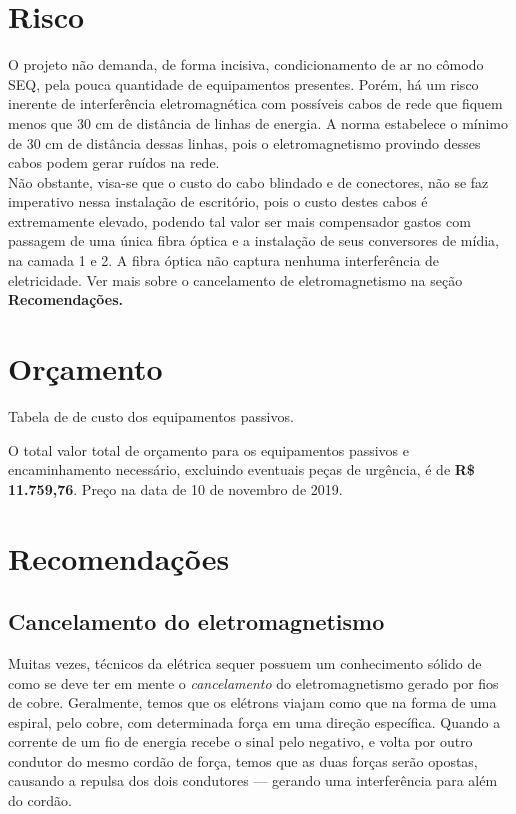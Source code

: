 \documentclass[	DIV=calc,%
							paper=a4,%
							fontsize=12pt,%
							onecolumn]{scrartcl}	 					%
\begin{document}
\section{Risco}

O projeto não demanda, de forma incisiva, condicionamento de ar no cômodo SEQ, pela pouca quantidade de equipamentos presentes. Porém, há um risco inerente de interferência eletromagnética com possíveis cabos de rede que fiquem menos que 30 cm de distância de linhas de energia. A norma estabelece o mínimo de 30 cm de distância dessas linhas, pois o eletromagnetismo provindo desses cabos podem gerar ruídos na rede.
\\

Não obstante, visa-se que o custo do cabo blindado e de conectores, não se faz imperativo nessa instalação de escritório, pois o custo destes cabos é extremamente elevado, podendo tal valor ser mais compensador gastos com passagem de uma única fibra óptica e a instalação de seus conversores de mídia, na camada 1 e 2. A fibra óptica não captura nenhuma interferência de eletricidade. Ver mais sobre o cancelamento de eletromagnetismo na seção \textbf{Recomendações.}
\\

\pagebreak

\section{Orçamento}
Tabela de de custo dos equipamentos passivos.
\vspace{0.5cm}






O total valor total de orçamento para os equipamentos passivos e encaminhamento necessário, excluindo eventuais peças de urgência, é de \textbf{R\$ 11.759,76}.
Preço na data de 10 de novembro de 2019.

\pagebreak

\section{Recomendações}

\subsection{Cancelamento do eletromagnetismo}

Muitas vezes, técnicos da elétrica sequer possuem um conhecimento sólido de como se deve ter em mente o \textit{cancelamento} do eletromagnetismo gerado por fios de cobre. Geralmente, temos que os elétrons viajam como que na forma de uma espiral, pelo cobre, com determinada força em uma direção específica. Quando a corrente de um fio de energia recebe o sinal pelo negativo, e volta por outro condutor do mesmo cordão de força, temos que as duas forças serão opostas, causando a repulsa dos dois condutores --- gerando uma interferência para além do cordão. 
\\
\end{document}
